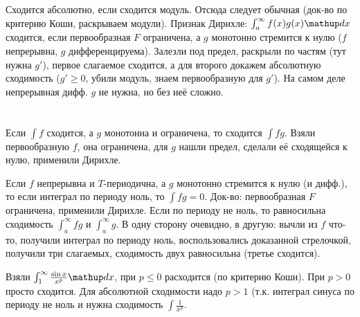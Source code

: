 \section{} %
Сходится абсолютно, если сходится модуль.
Отсюда следует обычная (док-во по критерию Коши, раскрываем модули).
Признак Дирихле: $\int_a^{\infty} f(x)g(x) \d x$ сходится, если первообразная $F$ ограничена, а $g$ монотонно стремится к нулю ($f$ непрерывна, $g$ дифференцируема).
Залезли под предел, раскрыли по частям (тут нужна $g'$), первое слагаемое сходится, а для второго докажем абсолютную сходимость ($g' \ge 0$, убили модуль, знаем первообразную для $g'$).
На самом деле непрерывная дифф. $g$ не нужна, но без неё сложно.

\section{} %
Если $\int f$ сходится, а $g$ монотонна и ограничена, то сходится $\int fg$.
Взяли первообразную $f$, она ограничена, для $g$ нашли предел, сделали её сходящейся к нулю, применили Дирихле.

Если $f$ непрерывна и $T$-периодична, а $g$ монотонно стремится к нулю (и дифф.), то если интеграл по периоду ноль, то $\int fg=0$.
Док-во: первообразная $F$ ограничена, применили Дирихле.
Если по периоду не ноль, то равносильна сходимость $\int_a^\infty fg$ и $\int_a^\infty g$.
В одну сторону очевидно, в другую: вычли из $f$ что-то, получили интеграл по периоду ноль, воспользовались доказанной стрелочкой,
получили три слагаемых, сходимость двух равносильна (третье сходится).

Взяли $\int_1^{\infty} \frac{\sin x}{x^p} \d x$, при $p\le 0$ расходится (по критерию Коши).
При $p>0$ просто сходится. Для абсолютной сходимости надо $p>1$ (т.к. интеграл синуса по периоду не ноль и нужна сходимость $\int\frac{1}{x^p}$.
